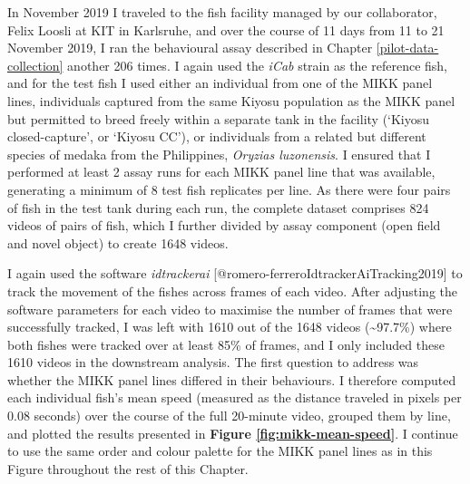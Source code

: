 \documentclass[
]{article}
\begin{document}
In November 2019 I traveled to the fish facility managed by our collaborator, Felix Loosli at KIT in Karlsruhe, and over the course of 11 days from 11 to 21 November 2019, I ran the behavioural assay described in Chapter \ref{pilot-data-collection} another 206 times. I again used the \emph{\textcolor{iCab_424B4D}{iCab}} strain as the reference fish, and for the test fish I used either an individual from one of the MIKK panel lines, individuals captured from the same Kiyosu population as the MIKK panel but permitted to breed freely within a separate tank in the facility (`Kiyosu closed-capture', or `Kiyosu CC'), or individuals from a related but different species of medaka from the Philippines, \emph{Oryzias luzonensis}. I ensured that I performed at least 2 assay runs for each MIKK panel line that was available, generating a minimum of 8 test fish replicates per line. As there were four pairs of fish in the test tank during each run, the complete dataset comprises 824 videos of pairs of fish, which I further divided by assay component (open field and novel object) to create 1648 videos.

I again used the software \emph{idtrackerai} {[}@romero-ferreroIdtrackerAiTracking2019{]} to track the movement of the fishes across frames of each video. After adjusting the software parameters for each video to maximise the number of frames that were successfully tracked, I was left with 1610 out of the 1648 videos (\textasciitilde97.7\%) where both fishes were tracked over at least 85\% of frames, and I only included these 1610 videos in the downstream analysis. The first question to address was whether the MIKK panel lines differed in their behaviours. I therefore computed each individual fish's mean speed (measured as the distance traveled in pixels per 0.08 seconds) over the course of the full 20-minute video, grouped them by line, and plotted the results presented in \textbf{Figure \ref{fig:mikk-mean-speed}}. I continue to use the same order and colour palette for the MIKK panel lines as in this Figure throughout the rest of this Chapter.
\end{document}

